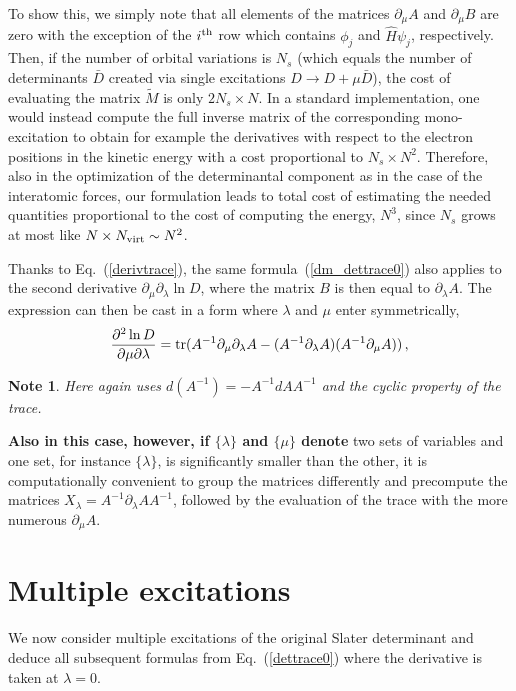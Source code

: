 \documentclass[aip,jcp,reprint,floatfix,onecolumn]{revtex4-1}
\newtheorem*{note}{Note}
\begin{document}
To show this, we simply note that all elements of the matrices $\partial_\mu A$ and $\partial_\mu B$ are zero with
the exception of the $i^{\rm th}$ row which contains $\phi_j$ and $\hat{H}\psi_j$, respectively. Then,
if the number of orbital variations is $N_s$ (which equals the number of determinants $\bar{D}$ created via single excitations $D\to D+\mu\bar{D}$), the cost of evaluating
the matrix $\tilde{M}$ is only $2N_s\times N$. In a standard implementation, one would
instead compute the full inverse matrix of the corresponding mono-excitation to obtain for example the derivatives with respect to the electron positions
in the kinetic energy with a cost proportional to $N_s\times N^2$.
Therefore, also in the optimization of the determinantal component as in the case of the interatomic forces, our formulation leads to total cost of estimating the needed quantities
proportional to the cost of computing the energy, $N^3$, since $N_s$  grows at most like $N\times N_{\rm virt} \sim N^2$.

Thanks to Eq.~(\ref{derivtrace}), the same formula~(\ref{dm_dettrace0}) also applies to the second derivative $\partial_\mu\partial_\lambda \ln D$, where the matrix $B$ is then equal to $\partial_\lambda A$. The expression can then be cast in a form where $\lambda$ and $\mu$ enter symmetrically,
\begin{eqnarray}
\frac{\partial^2  \ln D } {\partial \mu \partial \lambda}
={\rm tr}(A^{-1}\partial_\mu\partial_\lambda A-(A^{-1}\partial_\lambda A)(A^{-1}\partial_\mu A))\,,
\label{2deriv_sym}
\end{eqnarray}

\begin{note}
Here again uses $d(A^{-1})=-A^{-1}dA A^{-1}$ and the cyclic property of the trace.
\end{note}

{\bf Also in this case, however, if $\{\lambda\}$ and $\{\mu\}$ denote} two sets of variables and one set, for instance $\{\lambda\}$, is significantly smaller than the other, it is computationally convenient to group the matrices differently and precompute the matrices $X_\lambda =A^{-1}\partial_\lambda A A^{-1}$, followed by the evaluation of the trace with the more numerous $\partial_\mu A$.

\section{Multiple excitations}
\label{mexc}

We now consider multiple excitations of the original Slater determinant and deduce all subsequent formulas from Eq.~(\ref{dettrace0})
where the derivative is taken at $\lambda=0$.
\end{document}
